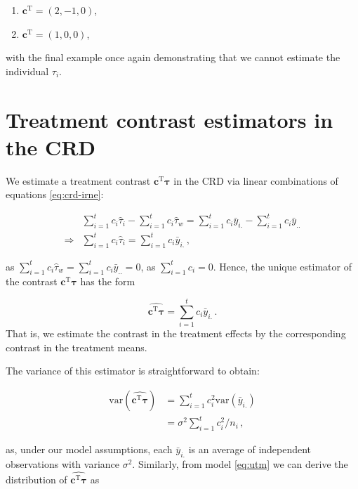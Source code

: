 \documentclass[
]{book}
\providecommand{\tightlist}{%
  \setlength{\itemsep}{0pt}\setlength{\parskip}{0pt}}
\theoremstyle{definition}
\theoremstyle{definition}
\theoremstyle{definition}
\theoremstyle{definition}
\theoremstyle{remark}
\begin{document}
\begin{enumerate}
\def\labelenumi{\arabic{enumi}.}
\setcounter{enumi}{5}
\tightlist
\item
  \(\boldsymbol{c}^{\mathrm{T}} = (2, -1, 0)\),
\item
  \(\boldsymbol{c}^{\mathrm{T}} = (1, 0, 0)\),
\end{enumerate}

with the final example once again demonstrating that we cannot estimate the individual \(\tau_i\).

\hypertarget{contrast-crd}{%
\section{Treatment contrast estimators in the CRD}\label{contrast-crd}}

We estimate a treatment contrast \(\boldsymbol{c}^{\mathrm{T}}\boldsymbol{\tau}\) in the CRD via linear combinations of equations \eqref{eq:crd-irne}:

\begin{align*}
& \sum_{i=1}^t c_i\hat{\tau}_i - \sum_{i=1}^tc_i\hat{\tau}_w = \sum_{i=1}^tc_i\bar{y}_{i.} - \sum_{i=1}^tc_i\bar{y}_{..} \\
\Rightarrow & \sum_{i=1}^t c_i\hat{\tau}_i = \sum_{i=1}^tc_i\bar{y}_{i.}\,,
\end{align*}

as \(\sum_{i=1}^tc_i\hat{\tau}_w = \sum_{i=1}^tc_i\bar{y}_{..} = 0\), as \(\sum_{i=1}^tc_i = 0\). Hence, the unique estimator of the contrast \(\boldsymbol{c}^{\mathrm{T}}\boldsymbol{\tau}\) has the form

\[
\widehat{\boldsymbol{c}^{\mathrm{T}}\boldsymbol{\tau}} = \sum_{i=1}^tc_i\bar{y}_{i.}\,.
\]
That is, we estimate the contrast in the treatment effects by the corresponding contrast in the treatment means.

The variance of this estimator is straightforward to obtain:

\begin{align*}
\mathrm{var}\left(\widehat{\boldsymbol{c}^{\mathrm{T}}\boldsymbol{\tau}}\right) 
& = \sum_{i=1}^tc_i^2\mathrm{var}(\bar{y}_{i.}) \\
& = \sigma^2\sum_{i=1}^tc_i^2/n_i\,,
\end{align*}

as, under our model assumptions, each \(\bar{y}_{i.}\) is an average of independent observations with variance \(\sigma^2\). Similarly, from model \eqref{eq:utm} we can derive the distribution of \(\widehat{\boldsymbol{c}^{\mathrm{T}}\boldsymbol{\tau}}\) as
\end{document}
